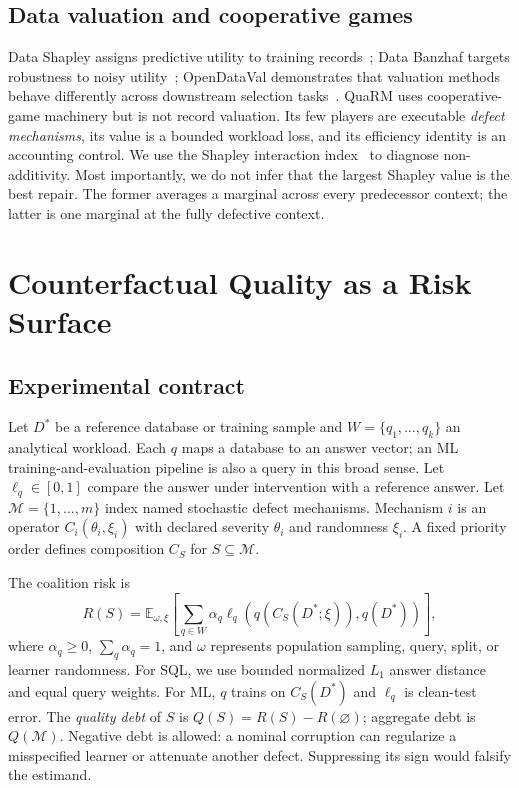 \documentclass[conference]{IEEEtran}
\newcommand{\method}{QuaRM}
\newcommand{\players}{\mathcal{M}}
\begin{document}
\subsection{Data valuation and cooperative games}

Data Shapley assigns predictive utility to training records~\cite{ghorbani2019datashapley}; Data Banzhaf targets robustness to noisy utility~\cite{wang2023banzhaf}; OpenDataVal demonstrates that valuation methods behave differently across downstream selection tasks~\cite{jiang2023opendataval}. \method{} uses cooperative-game machinery but is not record valuation. Its few players are executable \emph{defect mechanisms}, its value is a bounded workload loss, and its efficiency identity is an accounting control. We use the Shapley interaction index~\cite{grabisch1999interaction} to diagnose non-additivity. Most importantly, we do not infer that the largest Shapley value is the best repair. The former averages a marginal across every predecessor context; the latter is one marginal at the fully defective context.

\section{Counterfactual Quality as a Risk Surface}

\subsection{Experimental contract}

Let $D^*$ be a reference database or training sample and $W=\{q_1,\ldots,q_k\}$ an analytical workload. Each $q$ maps a database to an answer vector; an ML training-and-evaluation pipeline is also a query in this broad sense. Let $\ell_q\in[0,1]$ compare the answer under intervention with a reference answer. Let $\players=\{1,\ldots,m\}$ index named stochastic defect mechanisms. Mechanism $i$ is an operator $C_i(\theta_i,\xi_i)$ with declared severity $\theta_i$ and randomness $\xi_i$. A fixed priority order defines composition $C_S$ for $S\subseteq\players$.

The coalition risk is
\begin{equation}
 R(S)=\mathbb{E}_{\omega,\xi}\left[\sum_{q\in W}\alpha_q
 \ell_q\!\left(q(C_S(D^*;\xi)),q(D^*)\right)\right],
 \label{eq:risk}
\end{equation}
where $\alpha_q\ge 0$, $\sum_q\alpha_q=1$, and $\omega$ represents population sampling, query, split, or learner randomness. For SQL, we use bounded normalized $L_1$ answer distance and equal query weights. For ML, $q$ trains on $C_S(D^*)$ and $\ell_q$ is clean-test error. The \emph{quality debt} of $S$ is $Q(S)=R(S)-R(\varnothing)$; aggregate debt is $Q(\players)$. Negative debt is allowed: a nominal corruption can regularize a misspecified learner or attenuate another defect. Suppressing its sign would falsify the estimand.
\end{document}

